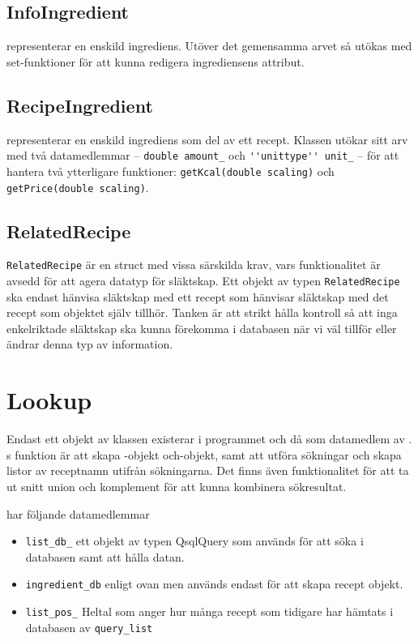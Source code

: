 \subsection{InfoIngredient}
\InfoIngredient representerar en enskild ingrediens. Utöver det gemensamma arvet så utökas \InfoIngredient med set-funktioner för att kunna redigera ingrediensens attribut.

\subsection{RecipeIngredient}
\RecipeIngredient{} representerar en enskild ingrediens som del av ett recept. Klassen utökar sitt arv med två datamedlemmar -- \verb=double amount_= och \verb=''unittype'' unit_= -- för att hantera två ytterligare funktioner: \verb+getKcal(double scaling)+ och \verb+getPrice(double scaling)+.
 
\subsection{RelatedRecipe}
\verb+RelatedRecipe+ är en struct med vissa särskilda krav, vars funktionalitet är avsedd för att agera datatyp för släktskap. Ett objekt av typen \verb+RelatedRecipe+ ska endast hänvisa släktskap med ett recept som hänvisar släktskap med det recept som objektet själv tillhör. Tanken är att strikt hålla kontroll så att inga enkelriktade släktskap ska kunna förekomma i databasen när vi väl tillför eller ändrar denna typ av information.



\section{Lookup}
Endast ett objekt av klassen \Lookup{} existerar i programmet och då som datamedlem av \Shell. \Lookup{}s funktion är att skapa \Recipe-objekt och\InfoIngredient-objekt, samt att utföra sökningar och skapa listor av receptnamn utifrån sökningarna. Det finns även funktionalitet för att ta ut snitt union och komplement för att kunna kombinera sökresultat.

\Lookup har följande datamedlemmar
  \begin{itemize}
    \item   \verb+list_db_+ ett objekt av typen QsqlQuery som används för att söka i databasen samt att hålla datan.
    \item   \verb+ingredient_db+ enligt ovan men används endast för att skapa recept objekt.
    \item   \verb+list_pos_+ Heltal som anger hur många recept som tidigare har hämtats i databasen av \verb+query_list+
  \end{itemize}

